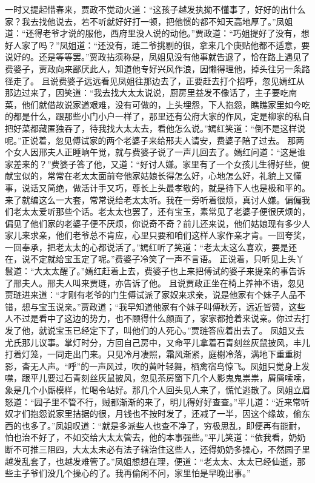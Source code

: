 \documentclass[12pt,oneside]{book}
\begin{document}
一时又提起惜春来，贾政不觉动火道：“这孩子越发执拗不懂事了，好好的出什么家？我去找他说去，若不听就好好打一顿，把他惯的都不知天高地厚了。”凤姐道：“还得老爷才说的服他，西府里没人说的动他。”贾政道：“巧姐提好了没有，想好人家了吗？”凤姐道：“还没有，琏二爷挑剔的很，拿来几个庚贴他都不适意，要说好的。还是等等罢。”贾政拈须称是，凤姐见没有他事就告退了，恰在路上遇见了费婆子，贾政向来鄙厌此人，知道他专好兴风作浪，因懒得理他，掉头往另一条路径走了。
且说费婆子远远看见凤姐往那边去了，正要赶去打个招呼，忽见嫣红从那边过来了，因笑道：“我去找大太太说说，厨房里益发不像话了，主子要吃南菜，他们就借故说家道艰难，没有可做的，上头埋怨，下人抱怨，瞧瞧家里如今吃的都是什么，跟那些小门小户一样了，那里还有公府大家的作风，定是柳家的私自把好菜都藏匿独吞了，待我找大太太去，看他怎么说。”嫣红笑道：“倒不是这样说呢。”正说着，忽见傅试家的两个老婆子来给邢夫人请安，费婆子陪了过去。
那两个女人因邢夫人正睡晌午觉，就与费婆子说了一声儿回去了。嫣红问道：“这是谁家差来的？”费婆子答了他，又道：“好讨人嫌。家里有了一个女孩儿生得好些，便献宝似的，常常在老太太面前夸他家姑娘长得怎么好，心地怎么好，礼貌上又懂事，说话又简绝，做活计手又巧，尊长上头最孝敬的，就是待下人也是极和平的。来了就编这么一大套，常常说给老太太听。我在一旁听着很烦，真讨人嫌。偏偏我们老太太爱听那些个话。老太太也罢了，还有宝玉，素常见了老婆子便很厌烦的，偏见了他们家的老婆子便不厌烦，你说奇不奇？前儿还来说，他们姑娘现有多少人家儿来求亲，他们老爷总不肯应，心里只要和咱们这样人家作亲才肯。一回夸奖，一回奉承，把老太太的心都说活了。”嫣红听了笑道：“老太太这么喜欢，要是还在，说不定就给宝玉定了呢。”费婆子冷笑了一声不言语。
正说着，只听见上头丫鬟道：“大太太醒了。”嫣红赶着上去，费婆子也上来把傅试的婆子来提亲的事告诉了邢夫人。邢夫人叫来贾琏，亦告诉了他。
且说贾政正坐在椅上养神不语，忽见贾琏进来道：“才刚有老爷的门生傅试派了家奴来求亲，说是他家有个妹子人品不错，想与宝玉说亲。”贾政道；“我早知道他家有个妹子叫傅秋芳，远近皆赞，这些人不过是看中了这边的势力，也不顾得什么颜面了，家家都抢着来说亲。你过去打发了他，就说宝玉已经定下了，叫他们的人死心。”贾琏答应着出去了。
凤姐又去尤氏那儿议事。掌灯时分，方回自己房中，又命平儿拿着石青刻丝灰鼠披风，丰儿打着灯笼，一同走出门来。只见冷月凄照，霜风渐紧，庭榭冷落，满地下重重树影，杳无人声。“呼”的一声风过，吹的黄叶轻舞，栖禽宿鸟惊飞。凤姐只觉身上发噤，跟平儿要过石青刻丝灰鼠披风，忽见茶房窗下几个人影鬼鬼祟祟，屑屑嗦嗦，象是几个小厮模样，忙喝令站好。那几个人回头见人来了，慌忙逃散了。凤姐立眉怒道：“园子里不管不行，贼都渐渐的来了，明儿得好好查查。”平儿道：“近来常听奴才们抱怨说家里拮据的很，月钱也不按时发了，还减了一半，因这个缘故，偷东西的也多了。”凤姐叹道：“就是多派些人也查不净了，穷极思乱，即便再有能耐，怕也治不好了，不如交给大太太管去，他的本事强些。”平儿笑道：“依我看，奶奶断不可推三阻四，大太太未必有法子辖治住这些人，还得奶奶多操心，不然园子里越发乱套了，也越发难管了。”凤姐想想在理，便道：“老太太、太太已经仙逝，那些主子爷们没几个操心的了。我再偷闲不问，家里怕是早晚出事。”
\end{document}

